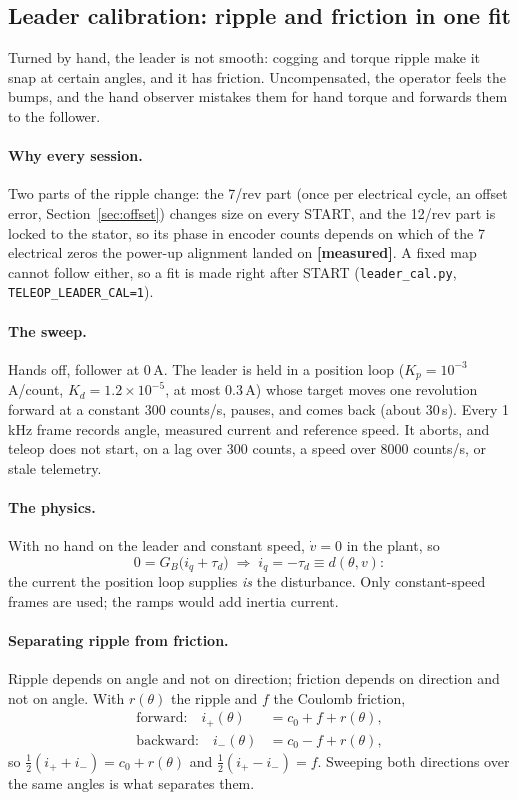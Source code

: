 \documentclass[11pt,a4paper]{article}
\newcommand{\iq}{i_q}
\newcommand{\file}[1]{\texttt{#1}}
\newcommand{\measured}{\textcolor{teal!70!black}{\textbf{[measured]}}}
\begin{document}
\subsection{Leader calibration: ripple and friction in one fit}
\label{sec:leadercal}

Turned by hand, the leader is not smooth: cogging and torque ripple make
it snap at certain angles, and it has friction. Uncompensated, the operator
feels the bumps, and the hand observer mistakes them for hand torque and
forwards them to the follower.

\paragraph{Why every session.} Two parts of the ripple change: the 7/rev
part (once per electrical cycle, an offset error,
Section~\ref{sec:offset}) changes size on every START, and the 12/rev part
is locked to the stator, so its phase in encoder counts depends on which
of the 7 electrical zeros the power-up alignment landed on \measured. A
fixed map cannot follow either, so a fit is made right after START
(\file{leader\_cal.py}, \texttt{TELEOP\_LEADER\_CAL=1}).

\paragraph{The sweep.} Hands off, follower at 0\,A. The leader is held in
a position loop ($K_p = 10^{-3}$\,A/count, $K_d = 1.2\times10^{-5}$,
at most 0.3\,A) whose target moves one revolution forward at a constant
$300$ counts/s, pauses, and comes back (about 30\,s). Every 1\,kHz frame
records angle, measured current and reference speed. It aborts, and
teleop does not start, on a lag over 300 counts, a speed over 8000
counts/s, or stale telemetry.

\paragraph{The physics.} With no hand on the leader and constant speed,
$\dot v = 0$ in the plant, so
\begin{equation}
  0 = G_B\bigl(\iq + \tau_{d}\bigr) \;\Longrightarrow\; \iq = -\tau_d \equiv d(\theta, v):
\end{equation}
the current the position loop supplies \emph{is} the disturbance. Only
constant-speed frames are used; the ramps would add inertia current.

\paragraph{Separating ripple from friction.} Ripple depends on angle and
not on direction; friction depends on direction and not on angle. With
$r(\theta)$ the ripple and $f$ the Coulomb friction,
\begin{align}
  \text{forward:}\quad  i_{+}(\theta) &= c_0 + f + r(\theta), \\
  \text{backward:}\quad i_{-}(\theta) &= c_0 - f + r(\theta),
\end{align}
so $\tfrac12(i_+ + i_-) = c_0 + r(\theta)$ and $\tfrac12(i_+ - i_-) = f$.
Sweeping both directions over the same angles is what separates them.
\end{document}
